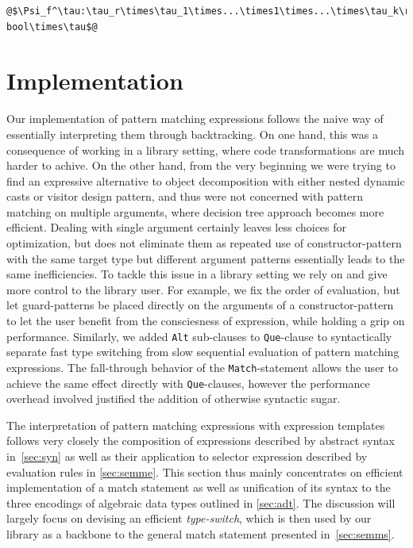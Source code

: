 \documentclass[preprint]{sigplanconf}
\makeatletter
\DeclareRobustCommand{\code}[1]{{\lstinline[breaklines=false,escapechar=@]{#1}}}
\makeatother
\begin{document}
\begin{lstlisting}
@$\Psi_f^\tau:\tau_r\times\tau_1\times...\times1\times...\times\tau_k\rightarrow bool\times\tau$@
\end{lstlisting} 

\section{Implementation} %
\label{sec:impl}

Our implementation of pattern matching expressions follows the naive way of 
essentially interpreting them through backtracking. On one hand, this was a 
consequence of working in a library setting, where code transformations are much 
harder to achive. On the other hand, from the very beginning we were trying to 
find an expressive alternative to object decomposition with either nested 
dynamic casts or visitor design pattern, and thus were not concerned with 
pattern matching on multiple arguments, where decision tree approach becomes 
more efficient. Dealing with single argument certainly leaves less choices for 
optimization, but does not eliminate them as repeated use of constructor-pattern 
with the same target type but different argument patterns essentially leads to 
the same inefficiencies. To tackle this issue in a library setting we rely on 
and give more control to the library user. For example, we fix the order of 
evaluation, but let guard-patterns be placed directly on the arguments of a 
constructor-pattern to let the user benefit from the consciesness of expression, 
while holding a grip on performance. Similarly, we added \code{Alt} sub-clauses 
to \code{Que}-clause to syntactically separate fast type switching from slow 
sequential evaluation of pattern matching expressions. The fall-through behavior 
of the \code{Match}-statement allows the user to achieve the same effect 
directly with \code{Que}-clauses, however the performance overhead involved 
justified the addition of otherwise syntactic sugar.

The interpretation of pattern matching expressions with expression templates follows 
very closely the composition of expressions described by abstract syntax 
in~\textsection\ref{sec:syn} as well as their application to selector expression 
described by evaluation rules in \textsection\ref{sec:semme}. This section thus
mainly concentrates on efficient implementation of a match statement as 
well as unification of its syntax to the three encodings of algebraic data types
outlined in \textsection\ref{sec:adt}. The discussion will largely focus on 
devising an efficient \emph{type-switch}, which is then used by our library as a 
backbone to the general match statement presented in~\textsection\ref{sec:semms}. 
\end{document}
